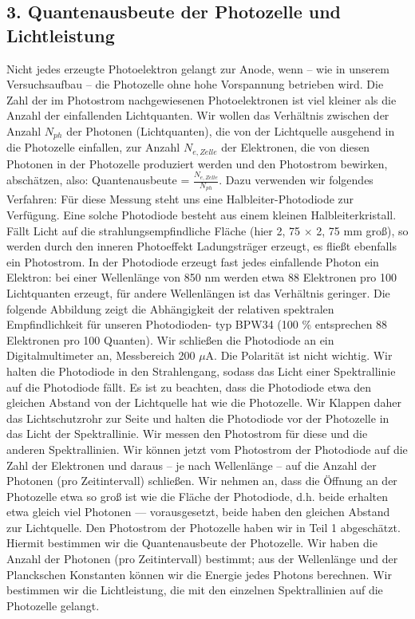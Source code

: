 \documentclass[12px]{scrartcl}
\begin{document}
\subsection{3. Quantenausbeute der Photozelle und Lichtleistung}
Nicht jedes erzeugte Photoelektron gelangt zur Anode, wenn -- wie in unserem Versuchsaufbau -- die
Photozelle ohne hohe Vorspannung betrieben wird. Die Zahl der im Photostrom nachgewiesenen Photoelektronen ist viel kleiner als die Anzahl der einfallenden Lichtquanten. %
Wir wollen das Verhältnis zwischen der Anzahl $N_{ph}$ der Photonen (Lichtquanten), die von der Lichtquelle ausgehend in die Photozelle einfallen, zur
Anzahl $N_{e,Zelle}$ der Elektronen, die von diesen Photonen in der Photozelle produziert werden und den Photostrom bewirken, abschätzen, also: Quantenausbeute = $\frac{N_{e,Zelle}} {N_{ph}}$.
Dazu verwenden wir folgendes Verfahren: Für diese Messung steht uns eine Halbleiter-Photodiode zur Verfügung. Eine solche Photodiode besteht aus einem kleinen Halbleiterkristall. Fällt Licht auf die strahlungsempfindliche Fläche (hier 2, 75 $\times$ 2, 75 mm groß), so werden durch den inneren Photoeffekt Ladungsträger erzeugt, es fließt ebenfalls ein Photostrom. In der Photodiode erzeugt fast jedes einfallende Photon ein Elektron: bei einer Wellenlänge von 850 nm werden
etwa 88 Elektronen pro 100 Lichtquanten erzeugt, für andere Wellenlängen ist das Verhältnis geringer.
Die folgende Abbildung zeigt die Abhängigkeit der relativen spektralen Empfindlichkeit für unseren Photodioden-
typ BPW34 (100 \% entsprechen 88 Elektronen pro 100 Quanten).
Wir schließen die Photodiode an ein Digitalmultimeter an, Messbereich 200 $\mu$A. Die Polarität ist nicht wichtig. Wir halten die Photodiode in den Strahlengang, sodass das Licht einer Spektrallinie auf die Photodiode fällt. Es ist zu beachten, dass die Photodiode etwa den gleichen Abstand von der Lichtquelle hat wie die Photozelle.
Wir Klappen daher das Lichtschutzrohr zur Seite
und halten die Photodiode vor der Photozelle in das Licht der Spektrallinie.
Wir messen den Photostrom für diese und die anderen Spektrallinien.
Wir können jetzt vom Photostrom der Photodiode auf die Zahl der Elektronen und daraus -- je nach Wellenlänge -- auf die Anzahl der Photonen (pro Zeitintervall) schließen. Wir nehmen an, dass die Öffnung an der Photozelle etwa so groß ist wie die Fläche der Photodiode, d.h. beide erhalten etwa gleich viel Photonen — vorausgesetzt, beide haben den gleichen Abstand zur Lichtquelle. Den Photostrom der Photozelle haben wir in Teil 1 abgeschätzt. Hiermit bestimmen wir die Quantenausbeute der Photozelle. Wir haben die Anzahl der Photonen (pro Zeitintervall) bestimmt; aus der Wellenlänge und der Planckschen Konstanten können wir die Energie jedes Photons berechnen. Wir bestimmen wir die Lichtleistung, die mit den einzelnen Spektrallinien auf die Photozelle gelangt.
\end{document}
